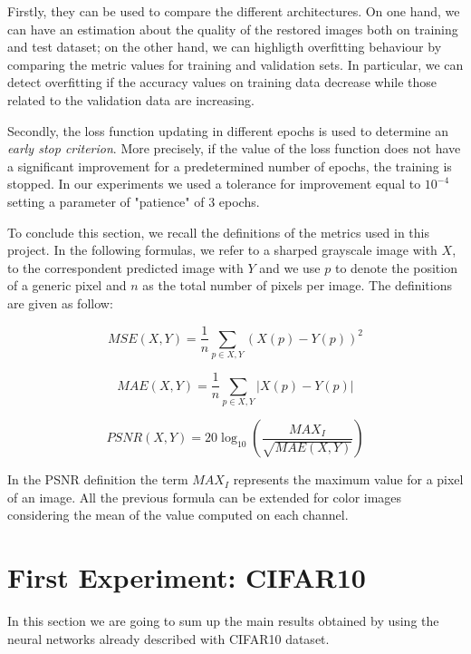 \documentclass[12pt,a4paper]{report}
\begin{document}
Firstly, they can be used to compare the different architectures. On one hand, we can have an estimation about the quality of the restored images both on training and test dataset; on the other hand, we can highligth overfitting behaviour by comparing the metric values for training and validation sets. In particular, we can detect overfitting if the accuracy values on training data decrease while those related to the validation data are increasing.


Secondly, the loss function updating in different epochs is used to determine an \textit{early stop criterion}. More precisely, if the value of the loss function does not have a significant improvement for a predetermined number of epochs, the training is stopped. In our experiments we used a tolerance for improvement equal to $10 ^ {- 4}$ setting a parameter of "patience" of $3$ epochs.

To conclude this section, we recall the definitions of the metrics used in this project. In the following formulas, we refer to a sharped grayscale image with $X$, to the correspondent predicted image with $Y$ and we use $p$ to denote the position of a generic pixel and $n$ as the total number of pixels per image. The definitions are given as follow:
 
\begin{equation}
MSE(X,Y) = \frac{1}{n}\sum_{p\in X,Y} (X(p)-Y(p))^2
\end{equation}

\begin{equation}
MAE(X,Y) = \frac{1}{n}\sum_{p\in X,Y} |X(p)-Y(p)|
\end{equation}

\begin{equation}
PSNR(X,Y) = 20 \log_{10} \left( \frac{MAX_I}{\sqrt{MAE(X,Y)}}\right) 
\end{equation}

In the PSNR definition the term $MAX_I$ represents the maximum value for a pixel of an image. All the previous formula can be extended for color images considering the mean of the value computed on each channel.

\section{First Experiment: CIFAR10}
In this section we are going to sum up the main results obtained by using the neural networks already described with CIFAR10 dataset.
\end{document}
